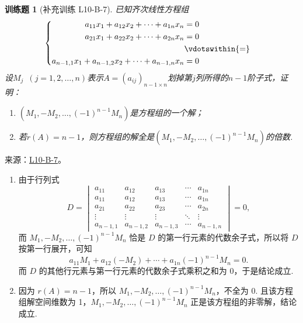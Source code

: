 \documentclass[12pt,fontset=fandol]{ctexart}
\newtheorem{exercise}{训练题}[section]
\begin{document}
\begin{exercise}[补充训练 L10-B-7]\label{prob:L10-B-7}
已知齐次线性方程组
        \[\begin{cases} \begin{aligned}
                    a_{11}x_1+a_{12}x_2+\cdots+a_{1n}x_n          & = 0             \\
                    a_{21}x_1+a_{22}x_2+\cdots+a_{2n}x_n          & = 0             \\
                                                                  & \vdotswithin{=} \\
                    a_{n-1,1}x_1+a_{n-1,2}x_2+\cdots+a_{n-1,n}x_n & = 0
                \end{aligned} \end{cases}\]
        设$M_j\enspace(j=1,2,\ldots,n)$表示$A=(a_{ij})_{n-1 \times n}$划掉第$j$列所得的$n-1$阶子式，证明：
        \begin{enumerate}
            \item $(M_1,-M_2,\ldots,(-1)^{n-1}M_n)$是方程组的一个解；

            \item 若$r(A)=n-1$，则方程组的解全是$(M_1,-M_2,\ldots,(-1)^{n-1}M_n)$的倍数.
        \end{enumerate}
\end{exercise}
\noindent 来源：\href{https://github.com/yhwu-is/Linear-Algebra-Left-Undone/blob/new/%E8%AE%B2%E4%B9%89/%E4%B8%93%E9%A2%98/10%20%E8%A1%8C%E5%88%97%E5%BC%8F.tex}{L10-B-7}。
\begin{solve}
\begin{enumerate}
                \item 由于行列式
                      \[ D = \begin{vmatrix}
                              a_{11}     & a_{12}     & a_{13}     & \cdots & a_{1n}     \\
                              a_{11}     & a_{12}     & a_{13}     & \cdots & a_{1n}     \\
                              a_{21}     & a_{22}     & a_{23}     & \cdots & a_{2n}     \\
                              \vdots     & \vdots     & \vdots     & \ddots & \vdots     \\
                              a_{n-1, 1} & a_{n-1, 2} & a_{n-1, 3} & \cdots & a_{n-1, n}
                          \end{vmatrix} = 0,\]
                      而 $M_1, -M_2, \ldots, (-1)^{n-1}M_n$ 恰是 $D$ 的第一行元素的代数余子式，所以将 $D$ 按第一行展开，可知\[a_{11}M_1+a_{12}(-M_2)+\cdots+a_{1n}(-1)^{n-1}M_n=0.\]
                      而 $D$ 的其他行元素与第一行元素的代数余子式乘积之和为 0，于是结论成立.

                \item 因为 $r(A) = n-1$，所以 $M_1, -M_2, \ldots, (-1)^{n-1}M_n$，不全为 0. 且该方程组解空间维数为 1，$M_1, -M_2, \ldots, (-1)^{n-1}M_n$ 正是该方程组的非零解，结论成立.
            \end{enumerate}
\end{solve}
\end{document}
